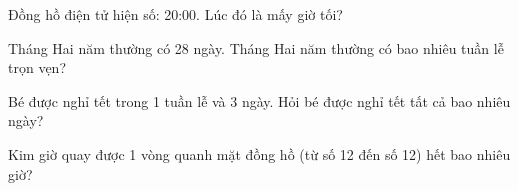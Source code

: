 \begin{ex} %
Đồng hồ điện tử hiện số: 20:00. Lúc đó là mấy giờ tối?
\end{ex}

\begin{ex} %
Tháng Hai năm thường có 28 ngày. Tháng Hai năm thường có bao nhiêu tuần lễ trọn vẹn?
\end{ex}

\begin{ex} %
Bé được nghỉ tết trong 1 tuần lễ và 3 ngày. Hỏi bé được nghỉ tết tất cả bao nhiêu ngày?
\end{ex}

\begin{ex} %
Kim giờ quay được 1 vòng quanh mặt đồng hồ (từ số 12 đến số 12) hết bao nhiêu giờ?
\end{ex}
